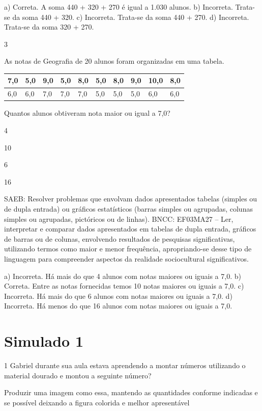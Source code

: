 \begin{escolha}
{\begin{escolha}
{a) Correta.  A soma 440 + 320 + 270 é igual a 1.030 alunos.
b) Incorreta. Trata-se da soma 440 + 320.
c) Incorreta. Trata-se da soma 440 + 270.
d) Incorreta. Trata-se da soma 320 + 270.

\num{3}

As notas de Geografia de 20 alunos foram organizadas em uma tabela.

\begin{longtable}[]{@{}llllllllll@{}}
\toprule
7,0 & 5,0 & 9,0 & 5,0 & 8,0 & 5,0 & 8,0 & 9,0 & 10,0 &
8,0\tabularnewline
\midrule
\endhead
6,0 & 6,0 & 7,0 & 7,0 & 7,0 & 5,0 & 5,0 & 5,0 & 6,0 & 6,0\tabularnewline
\bottomrule
\end{longtable}

Quantos alunos obtiveram nota maior ou igual a 7,0?

\begin{escolha}
\item
  4
\item
  10
\item
  6
\item
  16
\end{escolha}

SAEB: Resolver problemas que envolvam dados apresentados tabelas (simples ou de dupla entrada) ou gráficos estatísticos (barras simples ou agrupadas, colunas simples ou agrupadas, pictóricos ou de linhas). 
BNCC: EF03MA27 -- Ler, interpretar e comparar dados apresentados em tabelas de dupla entrada,
gráficos de barras ou de colunas, envolvendo resultados de pesquisas significativas, utilizando
termos como maior e menor frequência, apropriando-se desse tipo de linguagem para
compreender aspectos da realidade sociocultural significativos.

a) Incorreta. Há mais do que 4 alunos com notas maiores ou iguais a 7,0.
b) Correta. Entre as notas fornecidas temos 10 notas maiores ou iguais a 7,0.
c) Incorreta. Há mais do que 6 alunos com notas maiores ou iguais a 7,0.
d) Incorreta. Há menos do que 16 alunos com notas maiores ou iguais a 7,0.


\chapter{Simulado 1}

\num{1} Gabriel durante sua aula estava aprendendo a montar números utilizando o
material dourado e montou a seguinte número?

Produzir uma imagem como essa, mantendo as quantidades conforme
indicadas e se possível deixando a figura colorida e melhor apresentável

}
\end{escolha}}
\end{escolha}
